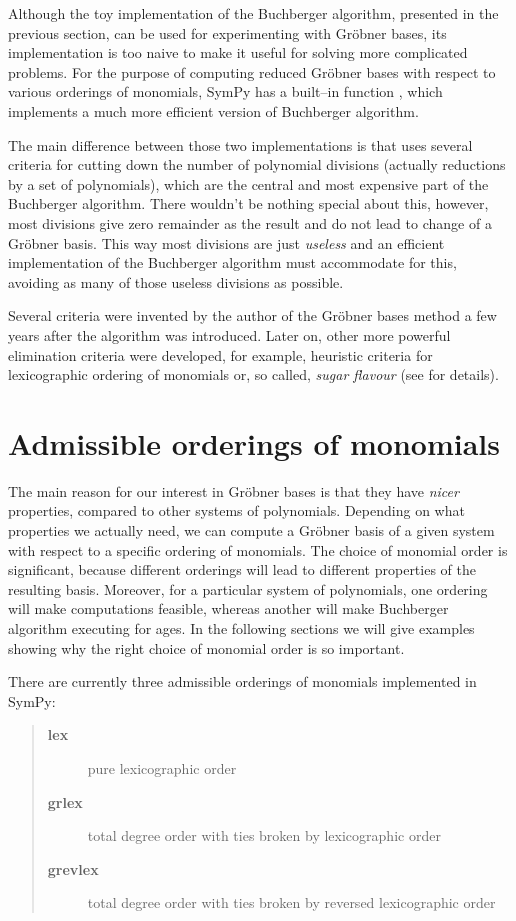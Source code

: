 Although the toy implementation of the Buchberger algorithm, presented in the previous section, can
be used for experimenting with Gröbner bases, its implementation is too naive to make it useful
for solving more complicated problems. For the purpose of computing reduced Gröbner bases with
respect to various orderings of monomials, SymPy has a built--in function , which
implements a much more efficient version of Buchberger algorithm.

The main difference between those two implementations is that  uses several criteria
for cutting down the number of polynomial divisions (actually reductions by a set of polynomials), which
are the central and most expensive part of the Buchberger algorithm. There wouldn't be nothing special
about this, however, most divisions give zero remainder as the result and do not lead to change of
a Gröbner basis. This way most divisions are just \emph{useless} and an efficient implementation of the
Buchberger algorithm must accommodate for this, avoiding as many of those useless divisions as possible.

Several criteria were invented by the author of the Gröbner bases method a few years after the
algorithm was introduced. Later on, other more powerful elimination criteria were developed, for
example, heuristic criteria for lexicographic ordering of monomials \cite{Czapor1991heuristic} or, so
called, \emph{sugar flavour} (see \cite{Giovini1991sugar} for details).
\section{Admissible orderings of monomials}\label{thesis-orderings}

The main reason for our interest in Gröbner bases is that they have \emph{nicer} properties, compared
to other systems of polynomials. Depending on what properties we actually need, we can compute a
Gröbner basis of a given system with respect to a specific ordering of monomials. The choice of
monomial order is significant, because different orderings will lead to different properties of the
resulting basis. Moreover, for a particular system of polynomials, one ordering will make computations
feasible, whereas another will make Buchberger algorithm executing for ages. In the following sections
we will give examples showing why the right choice of monomial order is so important.

There are currently three admissible orderings of monomials implemented in SymPy:
\begin{quote}
\begin{description}
\item[\textbf{lex}] \leavevmode
pure lexicographic order

\item[\textbf{grlex}] \leavevmode
total degree order with ties broken by lexicographic order

\item[\textbf{grevlex}] \leavevmode
total degree order with ties broken by reversed lexicographic order

\end{description}
\end{quote}

